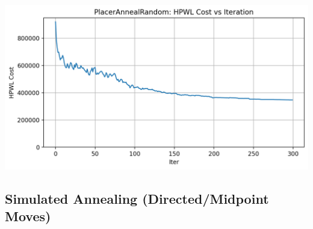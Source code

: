 {
    \centering
    \includegraphics[width=0.7\columnwidth]{figures/results/PlacerAnnealRandom/PlacerAnnealRandom_cost_history.png}
    \label{fig:PARCurve}
}

\subsection{Simulated Annealing (Directed/Midpoint Moves)}
